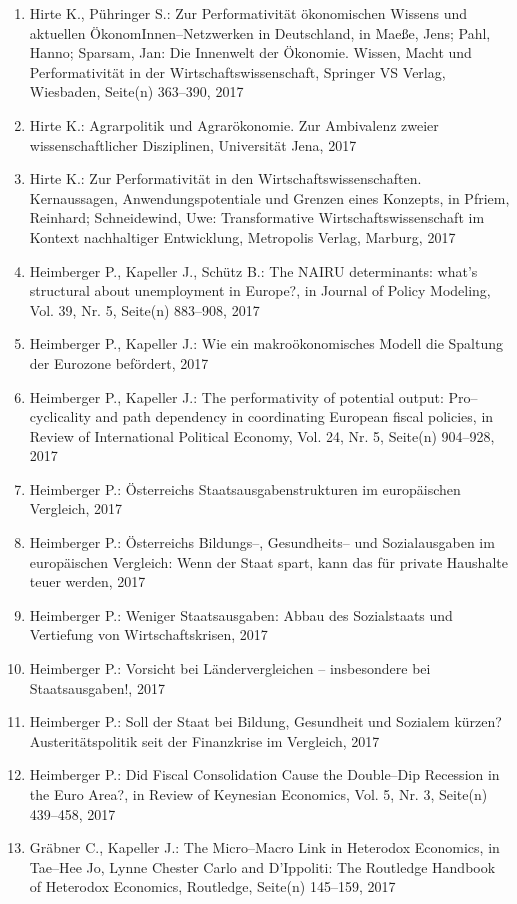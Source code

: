 \begin{enumerate}
	 \item Hirte K., Pühringer S.: Zur Performativität ökonomischen Wissens und aktuellen ÖkonomInnen--Netzwerken in Deutschland, in Maeße, Jens; Pahl, Hanno; Sparsam, Jan: Die Innenwelt der Ökonomie. Wissen, Macht und Performativität in der Wirtschaftswissenschaft, Springer VS Verlag, Wiesbaden, Seite(n) 363--390, 2017
	 \item Hirte K.: Agrarpolitik und Agrarökonomie. Zur Ambivalenz zweier wissenschaftlicher Disziplinen, Universität Jena, 2017
	 \item Hirte K.: Zur Performativität in den Wirtschaftswissenschaften. Kernaussagen, Anwendungspotentiale und Grenzen eines Konzepts, in Pfriem, Reinhard; Schneidewind, Uwe: Transformative Wirtschaftswissenschaft im Kontext nachhaltiger Entwicklung, Metropolis Verlag, Marburg, 2017
	 \item Heimberger P., Kapeller J., Schütz B.: The NAIRU determinants: what’s structural about unemployment in Europe?, in Journal of Policy Modeling, Vol. 39, Nr. 5, Seite(n) 883--908, 2017
	 \item Heimberger P., Kapeller J.: Wie ein makroökonomisches Modell die Spaltung der Eurozone befördert, 2017
	 \item Heimberger P., Kapeller J.: The performativity of potential output: Pro--cyclicality and path dependency in coordinating European fiscal policies, in Review of International Political Economy, Vol. 24, Nr. 5, Seite(n) 904--928, 2017
	 \item Heimberger P.: Österreichs Staatsausgabenstrukturen im europäischen Vergleich, 2017
	 \item Heimberger P.: Österreichs Bildungs--, Gesundheits-- und Sozialausgaben im europäischen Vergleich: Wenn der Staat spart, kann das für private Haushalte teuer werden, 2017
	 \item Heimberger P.: Weniger Staatsausgaben: Abbau des Sozialstaats und Vertiefung von Wirtschaftskrisen, 2017
	 \item Heimberger P.: Vorsicht bei Ländervergleichen – insbesondere bei Staatsausgaben!, 2017
	 \item Heimberger P.: Soll der Staat bei Bildung, Gesundheit und Sozialem kürzen? Austeritätspolitik seit der Finanzkrise im Vergleich, 2017
	 \item Heimberger P.: Did Fiscal Consolidation Cause the Double--Dip Recession in the Euro Area?, in Review of Keynesian Economics, Vol. 5, Nr. 3, Seite(n) 439--458, 2017
	 \item Gräbner C., Kapeller J.: The Micro--Macro Link in Heterodox Economics, in Tae--Hee Jo, Lynne Chester Carlo and D'Ippoliti: The Routledge Handbook of Heterodox Economics, Routledge, Seite(n) 145--159, 2017

\end{enumerate}
